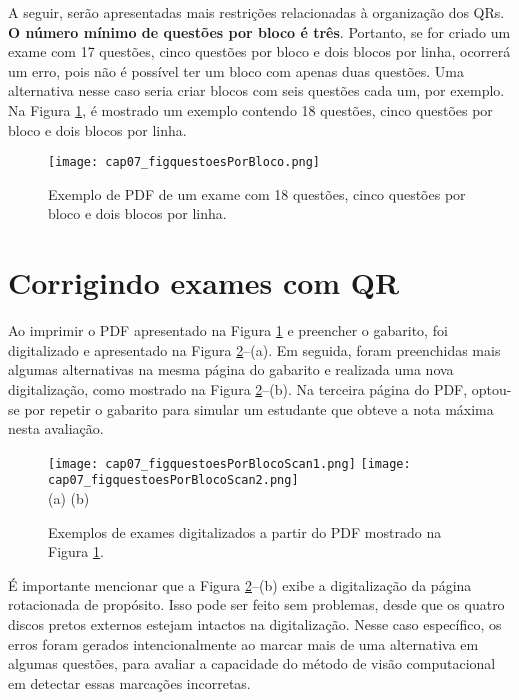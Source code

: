 A seguir, serão apresentadas mais restrições relacionadas à organização dos QRs. \textbf{O número mínimo de questões por bloco é três}. Portanto, se for criado um exame com 17 questões, cinco questões por bloco e dois blocos por linha, ocorrerá um erro, pois não é possível ter um bloco com apenas duas questões. Uma alternativa nesse caso seria criar blocos com seis questões cada um, por exemplo. Na Figura \ref{fig:cap07_figquestoesPorBloco}, é mostrado um exemplo contendo 18 questões, cinco questões por bloco e dois blocos por linha.



\begin{figure}[htbp]
\centering
\texttt{[image: cap07\_figquestoesPorBloco.png]}
\caption{Exemplo de PDF de um exame com 18 questões, cinco questões por bloco e dois blocos por linha.}
\label{fig:cap07_figquestoesPorBloco}
\end{figure}

\section{Corrigindo exames com QR}\label{sec:examesCorrigirQR}

Ao imprimir o PDF apresentado na Figura \ref{fig:cap07_figquestoesPorBloco} e preencher o gabarito, foi digitalizado e apresentado na Figura \ref{fig:cap07_figquestoesPorBlocoScan}--(a). Em seguida, foram preenchidas mais algumas alternativas na mesma página do gabarito e realizada uma nova digitalização, como mostrado na Figura \ref{fig:cap07_figquestoesPorBlocoScan}--(b). Na terceira página do PDF, optou-se por repetir o gabarito para simular um estudante que obteve a nota máxima nesta avaliação.


\begin{figure}[htbp]
\centering
\texttt{[image: cap07\_figquestoesPorBlocoScan1.png]}
\texttt{[image: cap07\_figquestoesPorBlocoScan2.png]}\\
(a) \hspace{7cm} (b)
\caption{Exemplos de exames digitalizados a partir do PDF mostrado na Figura \ref{fig:cap07_figquestoesPorBloco}.}
\label{fig:cap07_figquestoesPorBlocoScan}
\end{figure}

É importante mencionar que a Figura \ref{fig:cap07_figquestoesPorBlocoScan}--(b) exibe a digitalização da página rotacionada de propósito. Isso pode ser feito sem problemas, desde que os quatro discos pretos externos estejam intactos na digitalização. Nesse caso específico, os erros foram gerados intencionalmente ao marcar mais de uma alternativa em algumas questões, para avaliar a capacidade do método de visão computacional em detectar essas marcações incorretas. 

